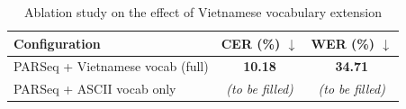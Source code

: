 \begin{table}[ht]
\centering
\small
\begin{tabular}{lcc}
\hline
\textbf{Configuration} & \textbf{CER (\%)} $\downarrow$ & \textbf{WER (\%)} $\downarrow$ \\
\hline
PARSeq + Vietnamese vocab (full) & \textbf{10.18} & \textbf{34.71} \\
PARSeq + ASCII vocab only & \textit{(to be filled)} & \textit{(to be filled)} \\
\hline
\end{tabular}
\caption{Ablation study on the effect of Vietnamese vocabulary extension}
\label{tab:ablation_vocab}
\end{table}
